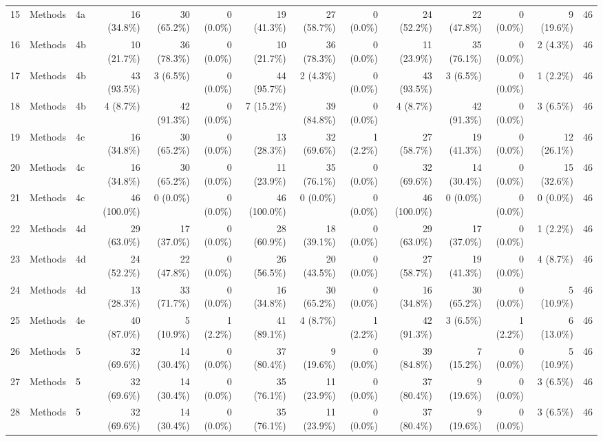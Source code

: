 \begin{longtable}{@{}rll*{11}{r}@{}}
15 & Methods & 4a & 16 (34.8\%) & 30 (65.2\%) & 0 (0.0\%) & 19 (41.3\%) & 27 (58.7\%) & 0 (0.0\%) & 24 (52.2\%) & 22 (47.8\%) & 0 (0.0\%) & 9 (19.6\%) & 46 \\
16 & Methods & 4b & 10 (21.7\%) & 36 (78.3\%) & 0 (0.0\%) & 10 (21.7\%) & 36 (78.3\%) & 0 (0.0\%) & 11 (23.9\%) & 35 (76.1\%) & 0 (0.0\%) & 2 (4.3\%) & 46 \\
17 & Methods & 4b & 43 (93.5\%) & 3 (6.5\%) & 0 (0.0\%) & 44 (95.7\%) & 2 (4.3\%) & 0 (0.0\%) & 43 (93.5\%) & 3 (6.5\%) & 0 (0.0\%) & 1 (2.2\%) & 46 \\
18 & Methods & 4b & 4 (8.7\%) & 42 (91.3\%) & 0 (0.0\%) & 7 (15.2\%) & 39 (84.8\%) & 0 (0.0\%) & 4 (8.7\%) & 42 (91.3\%) & 0 (0.0\%) & 3 (6.5\%) & 46 \\
19 & Methods & 4c & 16 (34.8\%) & 30 (65.2\%) & 0 (0.0\%) & 13 (28.3\%) & 32 (69.6\%) & 1 (2.2\%) & 27 (58.7\%) & 19 (41.3\%) & 0 (0.0\%) & 12 (26.1\%) & 46 \\
20 & Methods & 4c & 16 (34.8\%) & 30 (65.2\%) & 0 (0.0\%) & 11 (23.9\%) & 35 (76.1\%) & 0 (0.0\%) & 32 (69.6\%) & 14 (30.4\%) & 0 (0.0\%) & 15 (32.6\%) & 46 \\
21 & Methods & 4c & 46 (100.0\%) & 0 (0.0\%) & 0 (0.0\%) & 46 (100.0\%) & 0 (0.0\%) & 0 (0.0\%) & 46 (100.0\%) & 0 (0.0\%) & 0 (0.0\%) & 0 (0.0\%) & 46 \\
22 & Methods & 4d & 29 (63.0\%) & 17 (37.0\%) & 0 (0.0\%) & 28 (60.9\%) & 18 (39.1\%) & 0 (0.0\%) & 29 (63.0\%) & 17 (37.0\%) & 0 (0.0\%) & 1 (2.2\%) & 46 \\
23 & Methods & 4d & 24 (52.2\%) & 22 (47.8\%) & 0 (0.0\%) & 26 (56.5\%) & 20 (43.5\%) & 0 (0.0\%) & 27 (58.7\%) & 19 (41.3\%) & 0 (0.0\%) & 4 (8.7\%) & 46 \\
24 & Methods & 4d & 13 (28.3\%) & 33 (71.7\%) & 0 (0.0\%) & 16 (34.8\%) & 30 (65.2\%) & 0 (0.0\%) & 16 (34.8\%) & 30 (65.2\%) & 0 (0.0\%) & 5 (10.9\%) & 46 \\
25 & Methods & 4e & 40 (87.0\%) & 5 (10.9\%) & 1 (2.2\%) & 41 (89.1\%) & 4 (8.7\%) & 1 (2.2\%) & 42 (91.3\%) & 3 (6.5\%) & 1 (2.2\%) & 6 (13.0\%) & 46 \\
26 & Methods & 5 & 32 (69.6\%) & 14 (30.4\%) & 0 (0.0\%) & 37 (80.4\%) & 9 (19.6\%) & 0 (0.0\%) & 39 (84.8\%) & 7 (15.2\%) & 0 (0.0\%) & 5 (10.9\%) & 46 \\
27 & Methods & 5 & 32 (69.6\%) & 14 (30.4\%) & 0 (0.0\%) & 35 (76.1\%) & 11 (23.9\%) & 0 (0.0\%) & 37 (80.4\%) & 9 (19.6\%) & 0 (0.0\%) & 3 (6.5\%) & 46 \\
28 & Methods & 5 & 32 (69.6\%) & 14 (30.4\%) & 0 (0.0\%) & 35 (76.1\%) & 11 (23.9\%) & 0 (0.0\%) & 37 (80.4\%) & 9 (19.6\%) & 0 (0.0\%) & 3 (6.5\%) & 46 \\

\end{longtable}
